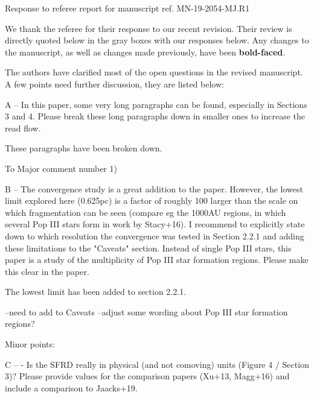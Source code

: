 \documentclass[11pt]{article}
\newenvironment{referee}[1][]{%
    \ignorespaces%
    \begin{mdframed}[style=myquotestyle,#1]%
}{%
    \end{mdframed}%
    \ignorespacesafterend%
}%
\begin{document}
\begin{center} 
\bfseries{
\begin{large}
  Response to referee report for manuscript ref. MN-19-2054-MJ.R1
\end{large}
}
\end{center}

We thank the referee for their response to our recent revision. Their review is directly quoted below in the gray boxes with our responses below.  Any changes to the manuscript, as well as changes made previously, have been \textbf{bold-faced}.

\begin{referee}
    The authors have clarified most of the open questions in the revised manuscript. A few points need further discussion, they are listed below: 
\end{referee}

\begin{referee}
    A -- In this paper, some very long paragraphs can be found, especially in Sections 3 and 4. Please break these long paragraphs down in smaller ones to increase the read flow. 
\end{referee}
    These paragraphs have been broken down. 

\begin{referee}
    To Major comment number 1) 

    B -- The convergence study is a great addition to the paper. However, the lowest limit explored here (0.625pc) is a factor of roughly 100 larger than the scale on which fragmentation can be seen (compare eg the 1000AU regions, in which several Pop III stars form in work by Stacy+16). I recommend to explicitly state down to which resolution the convergence was tested in Section 2.2.1 and adding these limitations to the "Caveats" section. Instead of single Pop III stars, this paper is a study of the multiplicity of Pop III star formation regions. Please make this clear in the paper. 
\end{referee}
    The lowest limit has been added to section 2.2.1.

    --need to add to Caveats
    --adjust some wording about Pop III star formation regions?

\begin{referee}
    Minor points: 

    C -- - Is the SFRD really in physical (and not comoving) units (Figure 4 / Section 3)? Please provide values for the comparison papers (Xu+13, Magg+16) and include a comparison to Jaacks+19. 
\end{referee}
\end{document}
